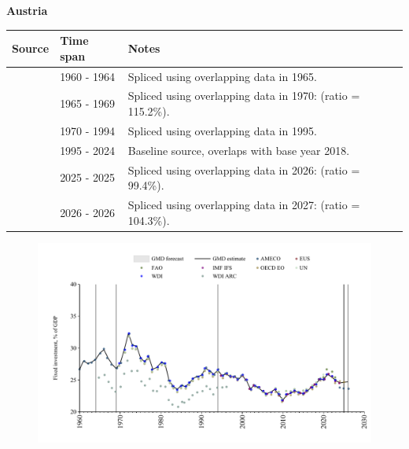 \documentclass[12pt,a4paper,landscape]{article}
\begin{document}
\begin{adjustbox}{max totalsize={\paperwidth}{\paperheight},center}
\begin{minipage}[t][\textheight][t]{\textwidth}
\vspace*{0.5cm}
{}
\begin{center}
{\Large\bfseries Austria}
\end{center}
\vspace{0.5cm}
\begin{table}[H]
\centering
\small
\begin{tabular}{|l|l|l|}
\hline
\textbf{Source} & \textbf{Time span} & \textbf{Notes} \\
\hline
\rowcolor{white}\cite{AMECO}& 1960 - 1964 &Spliced using overlapping data in 1965.\\
\rowcolor{lightgray}\cite{WDI_ARC}& 1965 - 1969 &Spliced using overlapping data in 1970: (ratio = 115.2\%).\\
\rowcolor{white}\cite{WDI}& 1970 - 1994 &Spliced using overlapping data in 1995.\\
\rowcolor{lightgray}\cite{EUS}& 1995 - 2024 &Baseline source, overlaps with base year 2018.\\
\rowcolor{white}\cite{OECD_EO}& 2025 - 2025 &Spliced using overlapping data in 2026: (ratio = 99.4\%).\\
\rowcolor{lightgray}\cite{AMECO}& 2026 - 2026 &Spliced using overlapping data in 2027: (ratio = 104.3\%).\\
\hline
\end{tabular}
\end{table}
\begin{figure}[H]
\centering
\includegraphics[width=\textwidth,height=0.6\textheight,keepaspectratio]{graphs/AUT_finv_GDP.pdf}
\end{figure}
\end{minipage}
\end{adjustbox}
\end{document}
